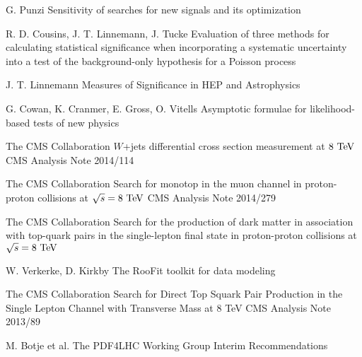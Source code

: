 \begin{thebibliography}{2}
             {G. Punzi}
             {Sensitivity of searches for new signals and its optimization}
             {}

             {R. D. Cousins, J. T. Linnemann, J. Tucke}
             {Evaluation of three methods for calculating
             statistical significance when incorporating a
             systematic uncertainty into a test of the
             background-only hypothesis for a Poisson
             process}
             {}

             {J. T. Linnemann}
             {Measures of Significance in HEP and Astrophysics}
             {}

             {G. Cowan, K. Cranmer, E. Gross, O. Vitells}
             {Asymptotic formulae for likelihood-based tests of new physics}
             {}


             {The CMS Collaboration}
             {$W$+jets differential cross section measurement at $8~\text{TeV}$}
             {CMS Analysis Note 2014/114}

             {The CMS Collaboration}
             {Search for monotop in the muon channel in proton-proton collisions at $\sqrt{s} = 8~\text{TeV}$}
             {CMS Analysis Note 2014/279}

             {The CMS Collaboration}
             {Search for the production of dark matter in association with top-quark pairs
             in the single-lepton final state in proton-proton collisions at $\sqrt{s} = 8~\text{TeV}$}
             {}

             {W. Verkerke, D. Kirkby}
             {The RooFit toolkit for data modeling}
             {}


             {The CMS Collaboration}
             {Search for Direct Top Squark Pair Production in the Single Lepton Channel
             with Transverse Mass at 8 TeV}
             {CMS Analysis Note 2013/89}

             {M. Botje et al.}
             {The PDF4LHC Working Group Interim Recommendations}
             {}


\end{thebibliography}

